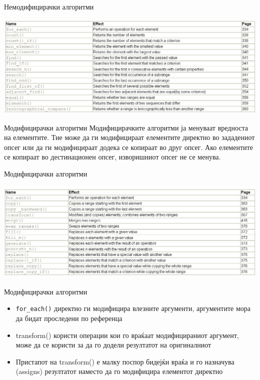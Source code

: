 \begin{frame}{Немодифицирачки алгоритми}
\begin{center}
\includegraphics[width=\textwidth]{images/non_modifying}
\end{center}
\end{frame}

\begin{frame}{Модифицирачки алгоритми}
Модифицирачките алгоритми ја менуваат вредноста на елементите. Тие може да ги
модифицираат елементите директно во зададениот опсег или да ги модифицираат
додека се копираат во друг опсег. Ако елементите се копираат во дестинационен
опсег, изворишниот опсег не се менува.
\end{frame}

\begin{frame}{Модифицирачки алгоритми}
\begin{center}
\includegraphics[width=\textwidth]{images/modifying}
\end{center}
\end{frame}

\begin{frame}{Модифицирачки алгоритми}
\begin{itemize}
  \item \texttt{for\_each()} директно ги модифицира влезните аргументи,
  аргументите мора да бидат проследени по референца
  \item transform() користи операции кои го враќаат модифицираниот аргумент,
  може да се користи за да го додели резултатот на оригиналниот
  \item Пристапот на transform() е малку поспор бидејќи враќа и го назначува
  (assigns) резултатот наместо да го модифицира елементот директно
\end{itemize}
\end{frame}
 
